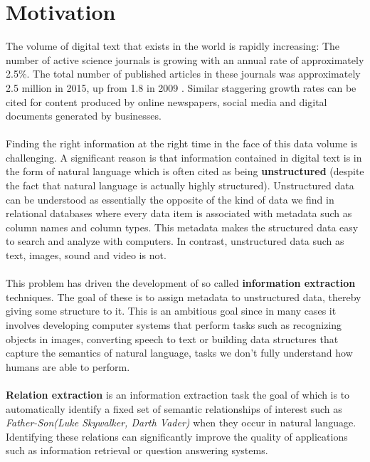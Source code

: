 \section{Motivation}
The volume of digital text that exists in the world is rapidly increasing: The number of active science journals is growing with an annual rate of approximately 2.5\%. The total number of published articles in these journals was approximately 2.5 million in 2015, up from 1.8 in 2009 \citep{ware2009, ware2015}. Similar staggering growth rates can be cited for content produced by online newspapers, social media and digital documents generated by businesses.
\\\\
Finding the right information at the right time in the face of this data volume is challenging. A significant reason is that information contained in digital text is in the form of natural language which is often cited as being \textbf{unstructured} (despite the fact that natural language is actually highly structured). Unstructured data can be understood as essentially the opposite of the kind of data we find in relational databases where every data item is associated with metadata such as column names and column types. This metadata makes the structured data easy to search and analyze with computers. In contrast, unstructured data such as text, images, sound and video is not.
\\\\
This problem has driven the development of so called \textbf{information extraction} techniques. The goal of these is to assign metadata to unstructured data, thereby giving some structure to it. This is an ambitious goal since in many cases it involves developing computer systems that perform tasks such as recognizing objects in images, converting speech to text or building data structures that capture the semantics of natural language, tasks we don't fully understand how humans are able to perform.
\\\\
\textbf{Relation extraction} is an information extraction task the goal of which is to automatically identify a fixed set of semantic relationships of interest such as \textit{Father-Son(Luke Skywalker, Darth Vader)} when they occur in natural language. Identifying these relations can significantly improve the quality of applications such as information retrieval or question answering systems.

